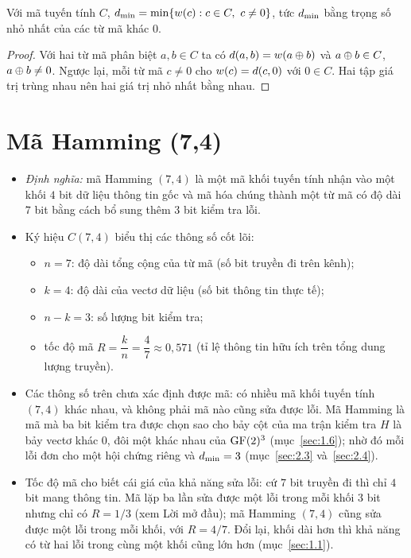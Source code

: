 \begin{menhde}\label{md:dmin-trongso}
Với mã tuyến tính $C$, $d_{\min} = \min\{w(c) : c \in C,\ c \neq 0\}$, tức
$d_{\min}$ bằng trọng số nhỏ nhất của các từ mã khác $0$.
\end{menhde}
\begin{proof}
Với hai từ mã phân biệt $a, b \in C$ ta có $d(a,b) = w(a \oplus b)$ và
$a \oplus b \in C$, $a \oplus b \neq 0$. Ngược lại, mỗi từ mã $c \neq 0$ cho
$w(c) = d(c,0)$ với $0 \in C$. Hai tập giá trị trùng nhau nên hai giá
trị nhỏ nhất bằng nhau.
\end{proof}

\section{Mã Hamming (7,4)}
\label{sec:1.4}

\begin{itemize}
  \item \emph{Định nghĩa:} mã Hamming $(7,4)$ là một mã khối tuyến tính nhận
        vào một khối $4$ bit dữ liệu thông tin gốc và mã hóa chúng thành một từ
        mã có độ dài $7$ bit bằng cách bổ sung thêm $3$ bit kiểm tra lỗi.
  \item Ký hiệu $C(7,4)$ biểu thị các thông số cốt lõi:
        \begin{itemize}
          \item $n = 7$: độ dài tổng cộng của từ mã (số bit truyền đi trên
                kênh);
          \item $k = 4$: độ dài của vectơ dữ liệu (số bit thông tin thực tế);
          \item $n - k = 3$: số lượng bit kiểm tra;
          \item tốc độ mã $R = \dfrac{k}{n} = \dfrac{4}{7} \approx 0{,}571$
                (tỉ lệ thông tin hữu ích trên tổng dung lượng truyền).
        \end{itemize}
  \item Các thông số trên chưa xác định được mã: có nhiều mã khối tuyến tính
        $(7,4)$ khác nhau, và không phải mã nào cũng sửa được lỗi. Mã Hamming
        là mã mà ba bit kiểm tra được chọn sao cho bảy cột của ma trận kiểm
        tra $H$ là bảy vectơ khác $0$, đôi một khác nhau của $\mathrm{GF}(2)^{3}$
        (mục~\ref{sec:1.6}); nhờ đó mỗi lỗi đơn cho một hội chứng riêng và
        $d_{\min} = 3$ (mục~\ref{sec:2.3} và~\ref{sec:2.4}).
  \item Tốc độ mã cho biết cái giá của khả năng sửa lỗi: cứ $7$ bit truyền đi
        thì chỉ $4$ bit mang thông tin. Mã lặp ba lần sửa được một lỗi trong
        mỗi khối $3$ bit nhưng chỉ có $R = 1/3$ (xem Lời mở đầu); mã Hamming
        $(7,4)$ cũng sửa được một lỗi trong mỗi khối, với $R = 4/7$. Đổi lại,
        khối dài hơn thì khả năng có từ hai lỗi trong cùng một khối cũng lớn
        hơn (mục~\ref{sec:1.1}).
\end{itemize}

